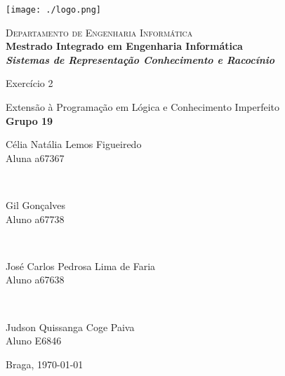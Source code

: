 \begin{titlepage}


\begin{minipage}{0.3\textwidth}
\begin{flushleft} 
\texttt{[image: ./logo.png]}
\end{flushleft}
\end{minipage}
\begin{minipage}{0.6\textwidth}
\begin{flushright} 

\textsc{Departamento de Engenharia Informática}\\[0.1cm]
\bfseries Mestrado Integrado em Engenharia Informática \\ [0.1cm]
\bfseries \textit{Sistemas de Representação Conhecimento e Racocínio}\\[8mm]

\end{flushright}
\end{minipage}


\vspace{3cm}


\begin{center}


\LARGE Exercício 2

\Large Extensão à Programação em Lógica e Conhecimento Imperfeito\\[1.5cm]


{\Large \bfseries Grupo 19\\[2cm] }

\begin{minipage}{0.4\textwidth}
		\large Célia Natália Lemos Figueiredo\\
           Aluna a67367
\end{minipage}
\\[1cm]
\begin{minipage}{0.4\textwidth}
		\large Gil Gonçalves \\
           Aluno a67738\\
\end{minipage}
\\[1cm]
\begin{minipage}{0.4\textwidth}
		\large José Carlos Pedrosa Lima de Faria\\
		Aluno  a67638
\end{minipage}
\\[1cm]
\begin{minipage}{0.4\textwidth}
	\large Judson Quissanga Coge Paiva\\
	Aluno  E6846
\end{minipage}


\vfill

\large Braga, {\large \today}

\end{center}
\end{titlepage}
